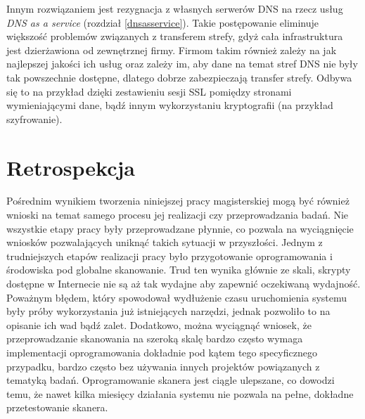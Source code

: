 Innym rozwiązaniem jest rezygnacja z własnych serwerów DNS na rzecz usług \textit{DNS as a service} (rozdział \ref{dnsasservice}). Takie postępowanie eliminuje większość
problemów związanych z transferem strefy, gdyż cała infrastruktura jest dzierżawiona od zewnętrznej firmy. Firmom takim również zależy
na jak najlepszej jakości ich usług oraz zależy im, aby dane na temat stref DNS nie były tak powszechnie dostępne, dlatego dobrze
zabezpieczają transfer strefy. Odbywa się to na przykład dzięki zestawieniu sesji SSL pomiędzy stronami wymieniającymi dane, bądź
innym wykorzystaniu kryptografii (na przykład szyfrowanie).

\section{Retrospekcja}
\noindent Pośrednim wynikiem tworzenia niniejszej pracy magisterskiej mogą być również wnioski na temat samego procesu jej realizacji czy przeprowadzania badań.
Nie wszystkie etapy pracy były przeprowadzane płynnie, co pozwala na wyciągnięcie wniosków pozwalających uniknąć takich sytuacji
w przyszłości. Jednym z trudniejszych etapów realizacji pracy było przygotowanie oprogramowania i środowiska pod globalne skanowanie.
Trud ten wynika głównie ze skali, skrypty dostępne w Internecie nie są aż tak wydajne aby zapewnić oczekiwaną wydajność. Poważnym
błędem, który spowodował wydłużenie czasu uruchomienia systemu były próby wykorzystania już istniejących narzędzi, jednak pozwoliło to
na opisanie ich wad bądź zalet. Dodatkowo, można wyciągnąć wniosek, że przeprowadzanie skanowania na szeroką skalę bardzo często wymaga
implementacji oprogramowania dokładnie pod kątem tego specyficznego przypadku, bardzo często bez używania innych projektów powiązanych
z tematyką badań. Oprogramowanie skanera jest ciągle ulepszane, co dowodzi temu, że nawet kilka miesięcy działania systemu nie pozwala
na pełne, dokładne przetestowanie skanera.
